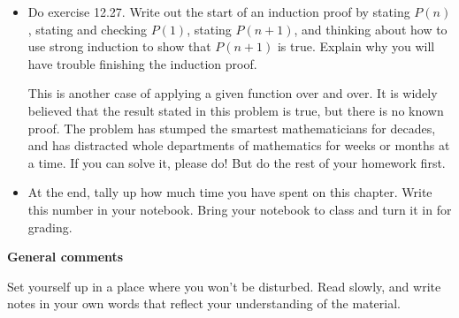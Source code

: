 \begin{itemize}
\item Do exercise 12.27.
Write out the start of an induction proof by stating $P(n)$, stating and checking $P(1)$, stating $P(n+1)$, and thinking about how to use strong induction to show that $P(n+1)$ is true.
Explain why you will have trouble finishing the induction proof.

This is another case of applying a given function over and over.
It is widely believed that the result stated in this problem is true, but there is no known proof.
The problem has stumped the smartest mathematicians for decades, and has distracted whole departments of mathematics for weeks or months at a time.
If you can solve it, please do!
But do the rest of your homework first.

\item At the end, tally up how much time you have spent on this chapter.
Write this number in your notebook.
Bring your notebook to class and turn it in for grading.
\end{itemize}

\noindent
{\bf General comments}

Set yourself up in a place where you won't be disturbed.
Read slowly, and write notes in your own words that reflect your understanding of the material.
